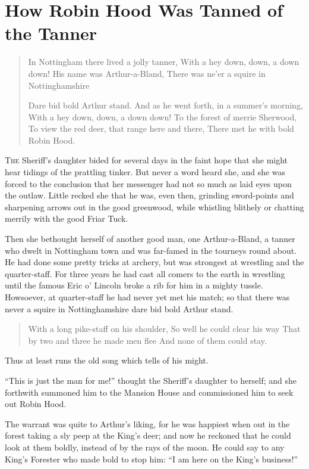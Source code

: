 \chapter{How Robin Hood Was Tanned of the Tanner}

\begin{quote}
In Nottingham there lived a jolly tanner,
With a hey down, down, a down down!
His name was Arthur-a-Bland,
There was ne’er a squire in Nottinghamshire

Dare bid bold Arthur stand.
And as he went forth, in a summer’s morning,
With a hey down, down, a down down!
To the forest of merrie Sherwood,
To view the red deer, that range here and there,
There met he with bold Robin Hood.
\end{quote}

\lettrine{T}{he} Sheriff's daughter bided for several days in the faint hope that she
might hear tidings of the prattling tinker. But never a word heard she,
and she was forced to the conclusion that her messenger had not so much
as laid eyes upon the outlaw. Little recked she that he was, even then,
grinding sword-points and sharpening arrows out in the good greenwood,
while whistling blithely or chatting merrily with the good Friar Tuck.

Then she bethought herself of another good man, one Arthur-a-Bland, a
tanner who dwelt in Nottingham town and was far-famed in the tourneys
round about. He had done some pretty tricks at archery, but was
strongest at wrestling and the quarter-staff. For three years he had
cast all comers to the earth in wrestling until the famous Eric o'
Lincoln broke a rib for him in a mighty tussle. Howsoever, at
quarter-staff he had never yet met his match; so that there was never a
squire in Nottinghamshire dare bid bold Arthur stand.

\begin{quote}
With a long pike-staff on his shoulder,
So well he could clear his way
That by two and three he made men flee
And none of them could stay.
\end{quote}

Thus at least runs the old song which tells of his might.

``This is just the man for me!'' thought the Sheriff's daughter to
herself; and she forthwith summoned him to the Mansion House and
commissioned him to seek out Robin Hood.

The warrant was quite to Arthur's liking, for he was happiest when out
in the forest taking a sly peep at the King's deer; and now he reckoned
that he could look at them boldly, instead of by the rays of the moon.
He could say to any King's Forester who made bold to stop him: ``I am
here on the King's business!''

